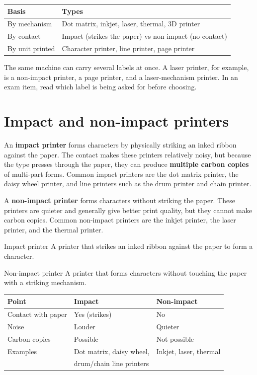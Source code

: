 \begin{center}
\begin{tabular}{p{}p{}}
\toprule
\textbf{Basis} & \textbf{Types} \\
\midrule
By mechanism & Dot matrix, inkjet, laser, thermal, 3D printer \\
By contact & Impact (strikes the paper) vs non-impact (no contact) \\
By unit printed & Character printer, line printer, page printer \\
\bottomrule
\end{tabular}
\end{center}

The same machine can carry several labels at once. A laser printer, for
example, is a non-impact printer, a page printer, and a laser-mechanism
printer. In an exam item, read which label is being asked for before choosing.

\section{Impact and non-impact printers}
An \textbf{impact printer} forms characters by physically striking an inked
ribbon against the paper. The contact makes these printers relatively noisy,
but because the type presses through the paper, they can produce
\textbf{multiple carbon copies} of multi-part forms. Common impact printers
are the dot matrix printer, the daisy wheel printer, and line printers such
as the drum printer and chain printer.

A \textbf{non-impact printer} forms characters without striking the paper.
These printers are quieter and generally give better print quality, but they
cannot make carbon copies. Common non-impact printers are the inkjet printer,
the laser printer, and the thermal printer.

\begin{definitionbox}{Impact printer}
A printer that strikes an inked ribbon against the paper to form a character.
\end{definitionbox}

\begin{definitionbox}{Non-impact printer}
A printer that forms characters without touching the paper with a striking
mechanism.
\end{definitionbox}

\begin{center}
\begin{tabular}{lll}
\toprule
\textbf{Point} & \textbf{Impact} & \textbf{Non-impact} \\
\midrule
Contact with paper & Yes (strikes) & No \\
Noise & Louder & Quieter \\
Carbon copies & Possible & Not possible \\
Examples & Dot matrix, daisy wheel, & Inkjet, laser, thermal \\
           & drum/chain line printers & \\
\bottomrule
\end{tabular}
\end{center}

